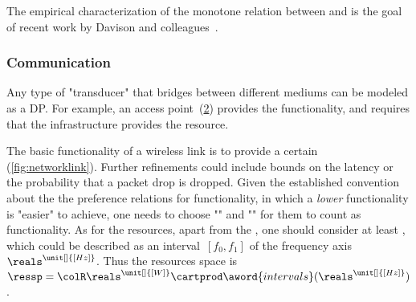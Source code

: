 \begin{figure}[h]
	\centering
	\caption{}
	\label{fig:progressive}
\end{figure}

\begin{example}
	The empirical characterization of the monotone relation between  and  is the goal of recent work by Davison and colleagues~\cite{nardi15introducing,zia16comparative}.
\end{example}

\subsubsection{Communication}

\begin{example}[Transducers]
	Any type of "transducer" that bridges between different mediums can be modeled as a DP.
	For example, an access point~(\cref{fig:accesspoint}) provides the  functionality, and requires that the infrastructure provides the  resource.
\end{example}

\begin{figure}[h]
	\centering
	\caption{}
	\label{fig:accesspoint}
\end{figure}

\begin{example}
	The basic functionality of a wireless link is to provide a certain  (\cref{fig:networklink}).
	Further refinements could include bounds on the latency or the probability that a packet drop is dropped.
	Given the established convention about the the preference relations for functionality, in which a \emph{lower} functionality is "easier"
	to achieve, one needs to choose "" and "" for them to count as functionality.
	As for the resources, apart from the , one should consider at least , which could be described as an interval~$[f_0,f_1]$ of the frequency axis $\reals^{\unit[]{[Hz]}}$.
	Thus the resources space is $\ressp=\colR\reals^{\unit[]{[W]}}\cartprod\aword{intervals}(\reals^{\unit[]{[Hz]}})$.
\end{example}
\begin{figure*}[h]
	\centering
	\caption{ }
	\label{fig:networklink}
\end{figure*}

